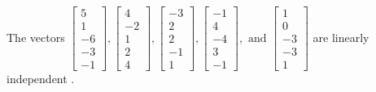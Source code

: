 \begin{exercise}
\begin{exerciseStatement}
  \end{exerciseStatement}
  \begin{exerciseAnswer}
   The vectors \(\left[\begin{array}{r}
5 \\
1 \\
-6 \\
-3 \\
-1
\end{array}\right] , \left[\begin{array}{r}
4 \\
-2 \\
1 \\
2 \\
4
\end{array}\right] , \left[\begin{array}{r}
-3 \\
2 \\
2 \\
-1 \\
1
\end{array}\right] , \left[\begin{array}{r}
-1 \\
4 \\
-4 \\
3 \\
-1
\end{array}\right] , \text{ and } \left[\begin{array}{r}
1 \\
0 \\
-3 \\
-3 \\
1
\end{array}\right]\) are 
  	 linearly independent  .
  


  \end{exerciseAnswer}
\end{exercise}